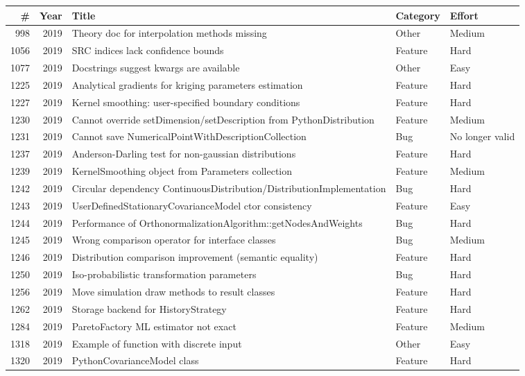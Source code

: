 \documentclass[a4paper,11pt]{article}
\begin{document}
\footnotesize
\begin{longtable}{rrp{7.1cm}ll}
\toprule
\# & Year & Title & Category & Effort \\
\midrule
\endhead
998 & 2019 & Theory doc for interpolation methods missing & Other & Medium \\
1056 & 2019 & SRC indices lack confidence bounds & Feature & Hard \\
1077 & 2019 & Docstrings suggest kwargs are available & Other & Easy \\
1225 & 2019 & Analytical gradients for kriging parameters estimation & Feature & Hard \\
1227 & 2019 & Kernel smoothing: user-specified boundary conditions & Feature & Hard \\
1230 & 2019 & Cannot override setDimension/setDescription from PythonDistribution & Feature & Medium \\
1231 & 2019 & Cannot save NumericalPointWithDescriptionCollection & Bug & No longer valid \\
1237 & 2019 & Anderson-Darling test for non-gaussian distributions & Feature & Hard \\
1239 & 2019 & KernelSmoothing object from Parameters collection & Feature & Medium \\
1242 & 2019 & Circular dependency ContinuousDistribution/DistributionImplementation & Bug & Hard \\
1243 & 2019 & UserDefinedStationaryCovarianceModel ctor consistency & Feature & Easy \\
1244 & 2019 & Performance of OrthonormalizationAlgorithm::getNodesAndWeights & Bug & Hard \\
1245 & 2019 & Wrong comparison operator for interface classes & Bug & Medium \\
1246 & 2019 & Distribution comparison improvement (semantic equality) & Feature & Hard \\
1250 & 2019 & Iso-probabilistic transformation parameters & Bug & Hard \\
1256 & 2019 & Move simulation draw methods to result classes & Feature & Hard \\
1262 & 2019 & Storage backend for HistoryStrategy & Feature & Hard \\
1284 & 2019 & ParetoFactory ML estimator not exact & Feature & Medium \\
1318 & 2019 & Example of function with discrete input & Other & Easy \\
1320 & 2019 & PythonCovarianceModel class & Feature & Hard \\

\end{longtable}
\end{document}
